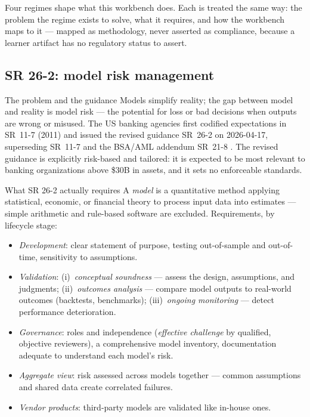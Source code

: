 \documentclass[11pt,a4paper]{article}
\newcommand{\usd}{\$}
\begin{document}
Four regimes shape what this workbench does. Each is treated the same
way: the problem the regime exists to solve, what it requires, and how
the workbench maps to it --- mapped as methodology, never asserted as
compliance, because a learner artifact has no regulatory status to
assert.

\subsection{SR 26-2: model risk management}

\begin{concept}{The problem and the guidance}
Models simplify reality; the gap between model and reality is model
risk --- the potential for loss or bad decisions when outputs are wrong
or misused. The US banking agencies first codified expectations in
SR~11-7 (2011) and issued the revised guidance SR~26-2 on 2026-04-17,
superseding SR~11-7 and the BSA/AML addendum SR~21-8 \cite{sr262}. The
revised guidance is explicitly risk-based and tailored: it is expected
to be most relevant to banking organizations above \usd{}30B in assets,
and it sets no enforceable standards.
\end{concept}

\begin{concept}{What SR 26-2 actually requires}
A \emph{model} is a quantitative method applying statistical, economic,
or financial theory to process input data into estimates --- simple
arithmetic and rule-based software are excluded. Requirements, by
lifecycle stage:
\begin{itemize}
\item \emph{Development}: clear statement of purpose, testing out-of-sample
  and out-of-time, sensitivity to assumptions.
\item \emph{Validation}: (i)~\emph{conceptual soundness} --- assess the
  design, assumptions, and judgments; (ii)~\emph{outcomes analysis} ---
  compare model outputs to real-world outcomes (backtests, benchmarks);
  (iii)~\emph{ongoing monitoring} --- detect performance deterioration.
\item \emph{Governance}: roles and independence (\emph{effective
  challenge} by qualified, objective reviewers), a comprehensive model
  inventory, documentation adequate to understand each model's risk.
\item \emph{Aggregate view}: risk assessed across models together ---
  common assumptions and shared data create correlated failures.
\item \emph{Vendor products}: third-party models are validated like
  in-house ones.
\end{itemize}
\end{concept}
\end{document}
